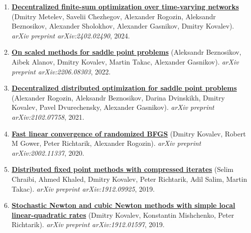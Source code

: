 \begin{enumerate}
\item
\textbf{\href{https://arxiv.org/abs/2402.02490}{Decentralized finite-sum optimization over time-varying networks}} (Dmitry Metelev, Savelii Chezhegov, Alexander Rogozin, Aleksandr Beznosikov, Alexander Sholokhov, Alexander Gasnikov, Dmitry Kovalev). \textit{arXiv preprint arXiv:2402.02490}, 2024.
\item
\textbf{\href{https://arxiv.org/abs/2206.08303}{On scaled methods for saddle point problems}} (Aleksandr Beznosikov, Aibek Alanov, Dmitry Kovalev, Martin Takac, Alexander Gasnikov). \textit{arXiv preprint arXiv:2206.08303}, 2022.
\item
\textbf{\href{https://arxiv.org/abs/2102.07758}{Decentralized distributed optimization for saddle point problems}} (Alexander Rogozin, Aleksandr Beznosikov, Darina Dvinskikh, Dmitry Kovalev, Pavel Dvurechensky, Alexander Gasnikov). \textit{arXiv preprint arXiv:2102.07758}, 2021.
\item
\textbf{\href{https://arxiv.org/abs/2002.11337}{Fast linear convergence of randomized BFGS}} (Dmitry Kovalev, Robert M Gower, Peter Richtarik, Alexander Rogozin). \textit{arXiv preprint arXiv:2002.11337}, 2020.
\item
\textbf{\href{https://arxiv.org/abs/1912.09925}{Distributed fixed point methods with compressed iterates}} (Selim Chraibi, Ahmed Khaled, Dmitry Kovalev, Peter Richtarik, Adil Salim, Martin Takac). \textit{arXiv preprint arXiv:1912.09925}, 2019.
\item
\textbf{\href{https://arxiv.org/abs/1912.01597}{Stochastic Newton and cubic Newton methods with simple local linear-quadratic rates}} (Dmitry Kovalev, Konstantin Mishchenko, Peter Richtarik). \textit{arXiv preprint arXiv:1912.01597}, 2019.
\end{enumerate}
